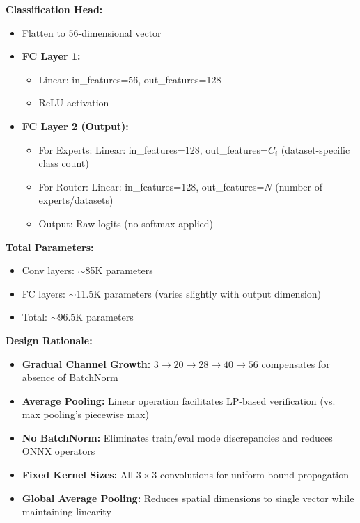 \documentclass[11pt,a4paper]{article}
\begin{document}
\textbf{Classification Head:}
\begin{itemize}
    \item Flatten to 56-dimensional vector
    \item \textbf{FC Layer 1:}
    \begin{itemize}
        \item Linear: in\_features=56, out\_features=128
        \item ReLU activation
    \end{itemize}

    \item \textbf{FC Layer 2 (Output):}
    \begin{itemize}
        \item For Experts: Linear: in\_features=128, out\_features=$C_i$ (dataset-specific class count)
        \item For Router: Linear: in\_features=128, out\_features=$N$ (number of experts/datasets)
        \item Output: Raw logits (no softmax applied)
    \end{itemize}
\end{itemize}

\textbf{Total Parameters:}
\begin{itemize}
    \item Conv layers: $\sim$85K parameters
    \item FC layers: $\sim$11.5K parameters (varies slightly with output dimension)
    \item Total: $\sim$96.5K parameters
\end{itemize}

\textbf{Design Rationale:}
\begin{itemize}
    \item \textbf{Gradual Channel Growth:} $3 \to 20 \to 28 \to 40 \to 56$ compensates for absence of BatchNorm
    \item \textbf{Average Pooling:} Linear operation facilitates LP-based verification (vs. max pooling's piecewise max)
    \item \textbf{No BatchNorm:} Eliminates train/eval mode discrepancies and reduces ONNX operators
    \item \textbf{Fixed Kernel Sizes:} All $3 \times 3$ convolutions for uniform bound propagation
    \item \textbf{Global Average Pooling:} Reduces spatial dimensions to single vector while maintaining linearity
\end{itemize}
\end{document}
